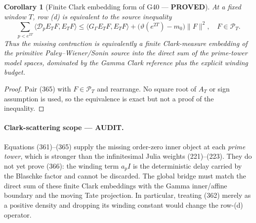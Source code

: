\documentclass[11pt]{article}
\newtheorem{corollary}[theorem]{Corollary}
\newcommand{\PROVED}{\textcolor{green!45!black}{\textbf{PROVED}}}
\newcommand{\AUDIT}{\textcolor{orange!75!black}{\textbf{AUDIT}}}
\begin{document}
\begin{corollary}[Finite Clark embedding form of G40 --- \PROVED]
At a fixed window $T$, row (d) is equivalent to the source inequality
\begin{equation}
 \boxed{
 \sum_{p<e^{2T}}
   \langle\mathcal D_pE_TF,E_TF\rangle
 \le
 \langle G_\Gamma E_TF,E_TF\rangle
 +\bigl(\vartheta(e^{2T})-m_0\bigr)\|F\|^2,
 \quad F\in\mathcal P_T.}                           \tag{366}
\end{equation}
Thus the missing contraction is equivalently a finite Clark-measure
embedding of the primitive Paley--Wiener/Sonin source into the direct sum of
the prime-tower model spaces, dominated by the Gamma Clark reference plus
the explicit winding budget.
\end{corollary}

\begin{proof}
Pair (365) with $F\in\mathcal P_T$ and rearrange.  No square root of $A_T$
or sign assumption is used, so the equivalence is exact but not a proof of
the inequality.
\end{proof}

\paragraph{Clark-scattering scope --- \AUDIT.}
Equations (361)--(365) supply the missing order-zero inner object at each
\emph{prime tower}, which is stronger than the infinitesimal Julia weights
(221)--(223).  They do not yet prove (366): the winding term $a_pI$ is the
deterministic delay carried by the Blaschke factor and cannot be discarded.
The global bridge must match the direct sum of these finite Clark embeddings
with the Gamma inner/affine boundary and the moving Tate projection.  In
particular, treating (362) merely as a positive density and dropping its
winding constant would change the row-(d) operator.
\end{document}
